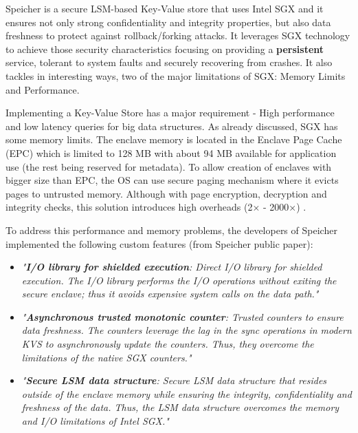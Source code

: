 Speicher \cite{speicher:1} is a secure \gls{LSM}-based Key-Value store that uses Intel \gls{SGX} and it ensures not only strong confidentiality and integrity properties, but also data freshness to protect against rollback/forking attacks. It leverages \gls{SGX} technology to achieve those security characteristics focusing on providing a \textbf{persistent} service, tolerant to system faults and securely recovering from crashes. It also tackles in interesting ways, two of the major limitations of \gls{SGX}: Memory Limits and Performance.

Implementing a Key-Value Store has a major requirement - High performance and low latency queries for big data structures. As already discussed, \gls{SGX} has some memory limits. The enclave memory is located in the Enclave Page Cache (\gls{EPC}) which is limited to 128 \gls{MB} with about 94 \gls{MB} available for application use (the rest being reserved for metadata). To allow creation of enclaves with bigger size than \gls{EPC}, the \gls{OS}  can use secure paging mechanism where it evicts pages to untrusted memory. Although with page encryption, decryption and integrity checks, this solution introduces high overheads (2× - 2000×) \cite{scone:1}.

To address this performance and memory problems, the developers of Speicher implemented the following custom features (from Speicher public paper):

\begin{itemize}
	\item \textit{"\textbf{I/O library for shielded execution}: Direct \gls{I/O} library for shielded execution. The \gls{I/O} library performs the \gls{I/O} operations without exiting the secure enclave; thus it avoids expensive system calls on the data path."}
	
	\item \textit{"\textbf{Asynchronous trusted monotonic counter}: Trusted counters to ensure data freshness. The counters leverage the lag in the sync operations in modern \gls{KVS} to asynchronously update the counters. Thus, they overcome the limitations of the native \gls{SGX} counters."}
	
	\item \textit{"\textbf{Secure \gls{LSM} data structure}: Secure \gls{LSM} data structure that resides outside of the enclave memory while ensuring the integrity, confidentiality and freshness of the data. Thus, the \gls{LSM} data structure overcomes the memory and \gls{I/O} limitations of Intel \gls{SGX}."}
\end{itemize}

